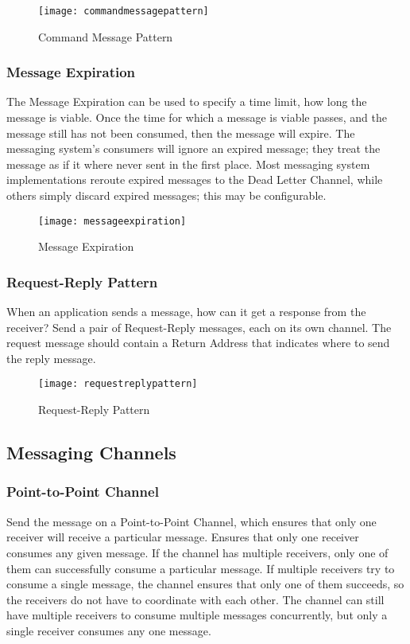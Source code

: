 \begin{figure}[H]
  \center
  \texttt{[image: commandmessagepattern]}
  \caption{Command Message Pattern}
\end{figure}

\subsubsection{Message Expiration}
The Message Expiration can be used to specify a time limit, how long the message is viable. Once the time for which a message is viable passes, and the message still has not been consumed, then the message will expire. The messaging system’s consumers will ignore an expired message; they treat the message as if it where never sent in the first place. Most messaging system implementations reroute expired messages to the Dead Letter Channel, while others simply discard expired messages; this may be configurable.

\begin{figure}[H]
  \center
  \texttt{[image: messageexpiration]}
  \caption{Message Expiration}
\end{figure}

\subsubsection{Request-Reply Pattern}
When an application sends a message, how can it get a response from the receiver? Send a pair of Request-Reply messages, each on its own channel. The request message should contain a Return Address that indicates where to send the reply message.

\begin{figure}[H]
  \center
  \texttt{[image: requestreplypattern]}
  \caption{Request-Reply Pattern}
\end{figure}

\pagebreak

\subsection{Messaging Channels}

\subsubsection{Point-to-Point Channel}
Send the message on a Point-to-Point Channel, which ensures that only one receiver will receive a particular message. Ensures that only one receiver consumes any given message. If the channel has multiple receivers, only one of them can successfully consume a particular message. If multiple receivers try to consume a single message, the channel ensures that only one of them succeeds, so the receivers do not have to coordinate with each other. The channel can still have multiple receivers to consume multiple messages concurrently, but only a single receiver consumes any one message.

